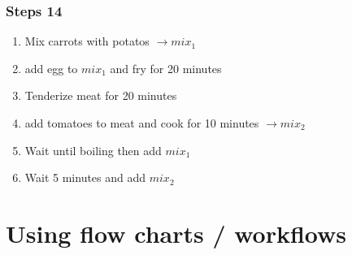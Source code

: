 \documentclass[letterpaper,10pt,english]{sphinxmanual}
\begin{document}
\subsubsection{Steps 1\sphinxhyphen{}4}
\label{\detokenize{01-Introduction:steps-1-4}}\begin{enumerate}
%
\item {} 
\sphinxAtStartPar
{} Mix carrots with potatos \(\rightarrow  mix_1\)

\item {} 
\sphinxAtStartPar
{} add egg to \(mix_1\) and fry for 20 minutes

\item {} 
\sphinxAtStartPar
{} Tenderize meat for 20 minutes

\item {} 
\sphinxAtStartPar
{} add tomatoes to meat and cook for 10 minutes \(\rightarrow mix_2\)

\item {} 
\sphinxAtStartPar
{} Wait until boiling then add \(mix_1\)

\item {} 
\sphinxAtStartPar
{} Wait 5 minutes and add \(mix_2\)

\end{enumerate}


\section{Using flow charts / workflows}
\label{\detokenize{01-Introduction:using-flow-charts-workflows}}
\end{document}
